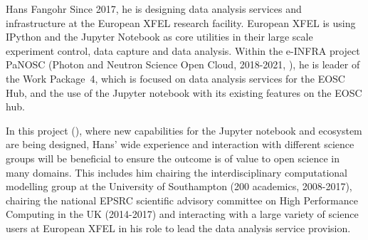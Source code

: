 \begin{participant}[type=leadPI,PM=5,gender=male]{Hans Fangohr}
  Since 2017, he is designing data analysis services and
  infrastructure at the European XFEL research facility. European XFEL
  is using IPython and the Jupyter Notebook as core utilities in their
  large scale experiment control, data capture and data
  analysis. Within the e-INFRA project PaNOSC (Photon and Neutron
  Science Open Cloud, 2018-2021, \cite{panosc}), he is leader of the
  Work Package~4, which is focused on data analysis services for the
  EOSC Hub, and the use of the Jupyter notebook with its existing
  features on the EOSC hub.

  In this project (\TheProject), where new capabilities for the Jupyter
  notebook and ecosystem are being designed, Hans' wide experience and
  interaction with different science groups will be beneficial to
  ensure the outcome is of value to open science in many domains. This
  includes him chairing the interdisciplinary computational modelling
  group at the University of Southampton (200 academics, 2008-2017),
  chairing the national EPSRC scientific advisory committee on High
  Performance Computing in the UK (2014-2017) and interacting with a
  large variety of science users at European XFEL in his role
  to lead the data analysis service provision.
\end{participant}

